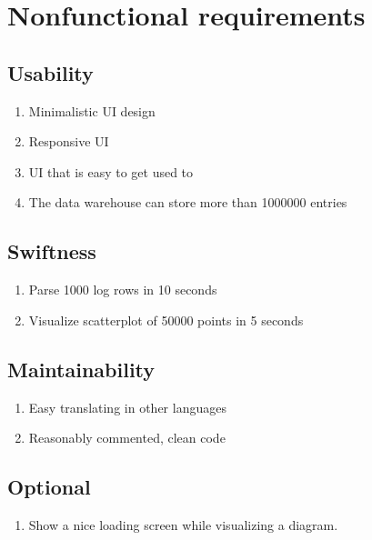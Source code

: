 \section{Nonfunctional requirements}

\renewcommand{\theenumi}{/N\arabic{enumi}0/}
\renewcommand{\labelenumi}{\theenumi}

 
\subsection{Usability}

\begin{enumerate}
  \item Minimalistic UI design
  \item Responsive UI
  \item UI that is easy to get used to
  \label{N1}
  \item The data warehouse can store more than 1000000 entries
\end{enumerate}

\subsection{Swiftness}

\begin{enumerate}[resume] %
	\item Parse 1000 log rows in 10 seconds
	
	\item Visualize scatterplot of 50000 points in 5 seconds
\end{enumerate}

\subsection{Maintainability}

\begin{enumerate}[resume]
  \item Easy translating in other languages
  \item Reasonably commented, clean code
\end{enumerate}


\subsection{Optional}

\begin{enumerate}[resume]
  \item Show a nice loading screen while visualizing a diagram. 
\end{enumerate}
